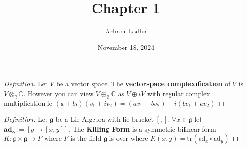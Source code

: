 \documentclass{article}
\newcommand{\C}{\mathbb{C}}
\newcommand{\R}{\mathbb{R}}
\newcommand{\lie}[1]{\mathfrak{#1}}
\newcommand{\ad}[1]{\text{ad}_{#1}}
\newcommand{\tr}[1]{\text{tr}\left(#1\right)}
\newenvironment{definition}
{\renewcommand\qedsymbol{$\blacksquare$}\begin{proof}[Definition]}
{\end{proof}}
\begin{document}
\title{Chapter 1}
\author{Arham Lodha}%
\date{November 18, 2024}%
\maketitle

\begin{definition}
    Let $V$ be a vector space. The \textbf{vectorspace complexification} of $V$ is $V \otimes_{\R} \C$. However you can view $V \oplus_{\R} \C$ as $V \oplus iV$ with regular complex multiplication ie $(a + bi)(v_1 + iv_2) = (a v_1 - b v_2) + i(bv_1 + av_2)$      
\end{definition}

\begin{definition}
    Let $\lie{g}$ be a Lie Algebra with lie bracket $[,]$. $\forall x \in \lie{g}$ let $\mathbf{\ad{x}} := [y \to [x, y]]$. The \textbf{Killing Form} is a symmetric bilinear form $K: \lie{g} \times \lie{g} \to F$ where $F$ is the field $\lie{g}$ is over where $K(x, y) = \tr{\ad{x} \circ \ad{y}}$         
\end{definition}
\end{document}
